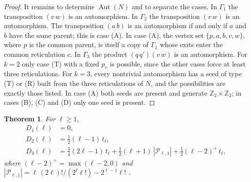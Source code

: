 \documentclass[11pt,a4paper]{article}
\newtheorem{theorem}{Theorem}[section]
\theoremstyle{definition}
\newcommand{\Aut}{\operatorname{Aut}}
\newcommand{\cP}{\mathcal{P}}
\begin{document}
\begin{proof}
It remains to determine $\Aut(N)$ and to separate the cases. In $\Gamma_1$ the transposition $(v\,w)$ is an automorphism. In $\Gamma_2$ the transposition $(v\,w)$ is an automorphism. The transposition $(a\,b)$ is an automorphism if and only if $a$ and $b$ have the same parent; this is case (A). In case (A), the vertex set $\{p,a,b,v,w\}$, where $p$ is the common parent, is itself a copy of $\Gamma_1$ whose exits enter the common reticulation $c$. In $\Gamma_3$ the product $(q\,q')(v\,w)$ is an automorphism. For $k=2$ only case (T) with a fixed $p_v$ is possible, since the other cases force at least three reticulations. For $k=3$, every nontrivial automorphism has a seed of type (T) or (R) built from the three reticulations of $N$, and the possibilities are exactly those listed. In case (A) both seeds are present and generate $\mathbb{Z}_2\times\mathbb{Z}_2$; in cases (B), (C) and (D) only one seed is present.
\end{proof}

\begin{theorem}\label{thm:defects}
For $\ell\ge1$,
\begin{align}
D_1(\ell)&=0,\label{eq:D1}\\
D_2(\ell)&=\tfrac12(\ell-1)\,t_\ell,\label{eq:D2}\\
D_3(\ell)&=\tfrac34(2\ell-1)\,t_\ell+\tfrac12(\ell+1)\,|\cP_{\ell,1}|+\tfrac12(\ell-2)^{+}\,t_\ell,\label{eq:D3}
\end{align}
where $(\ell-2)^+=\max(\ell-2,0)$ and $|\cP_{\ell,1}|=\ell\,(2\ell)!/(2^\ell\ell!)-2^{\ell-1}\ell!$ \cite{Zhang19}.
\end{theorem}
\end{document}

